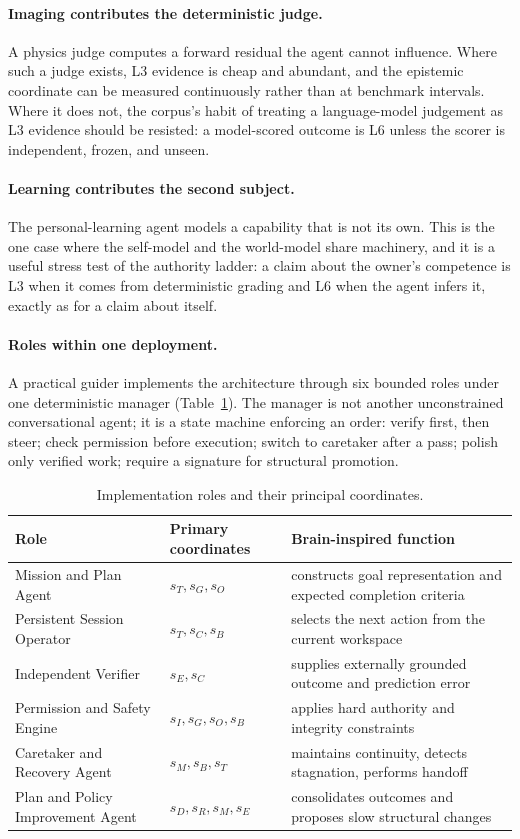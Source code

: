 \documentclass[11pt]{article}
\begin{document}
\paragraph{Imaging contributes the deterministic judge.} A physics judge computes a forward residual the agent cannot influence. Where such a judge exists, L3 evidence is cheap and abundant, and the epistemic coordinate can be measured continuously rather than at benchmark intervals. Where it does not, the corpus's habit of treating a language-model judgement as L3 evidence should be resisted: a model-scored outcome is L6 unless the scorer is independent, frozen, and unseen.

\paragraph{Learning contributes the second subject.} The personal-learning agent models a capability that is not its own. This is the one case where the self-model and the world-model share machinery, and it is a useful stress test of the authority ladder: a claim about the owner's competence is L3 when it comes from deterministic grading and L6 when the agent infers it, exactly as for a claim about itself.

\paragraph{Roles within one deployment.} A practical guider implements the architecture through six bounded roles under one deterministic manager (Table~\ref{tab:roles}). The manager is not another unconstrained conversational agent; it is a state machine enforcing an order: verify first, then steer; check permission before execution; switch to caretaker after a pass; polish only verified work; require a signature for structural promotion.

\begin{table}[t]
\centering\small
\caption{Implementation roles and their principal coordinates.}
\label{tab:roles}
\begin{tabular}{p{4.6cm} p{3.2cm} p{7.4cm}}
\toprule
\textbf{Role} & \textbf{Primary coordinates} & \textbf{Brain-inspired function} \\
\midrule
Mission and Plan Agent & $s_T, s_G, s_O$ & constructs goal representation and expected completion criteria \\
Persistent Session Operator & $s_T, s_C, s_B$ & selects the next action from the current workspace \\
Independent Verifier & $s_E, s_C$ & supplies externally grounded outcome and prediction error \\
Permission and Safety Engine & $s_I, s_G, s_O, s_B$ & applies hard authority and integrity constraints \\
Caretaker and Recovery Agent & $s_M, s_B, s_T$ & maintains continuity, detects stagnation, performs handoff \\
Plan and Policy Improvement Agent & $s_D, s_R, s_M, s_E$ & consolidates outcomes and proposes slow structural changes \\
\bottomrule
\end{tabular}
\end{table}
\end{document}
